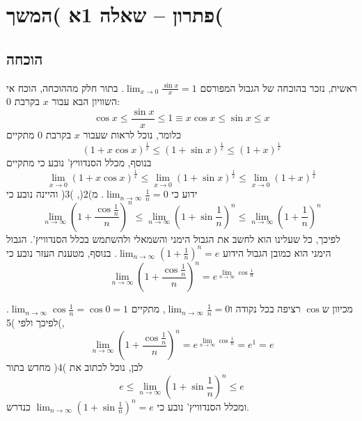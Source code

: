 \documentclass[11pt, oneside]{article}
\newcommand{\qed}{\R{$\blacksquare$}}
\newcommand{\br}{\\\\\\\\\\\\\\}
\begin{document}
\section*{פתרון -- שאלה 1א )המשך(}
\subsection*{הוכחה}
ראשית, נזכר בהוכחה של הגבול המפורסם $\lim_{x \to 0} \frac{\sin{x}}{x} = 1$. בתור חלק מההוכחה, הוכח אי השוויון הבא עבור $x$ בקרבת 0:
\[
\cos{x} \le \frac{\sin{x}}{x} \le 1 \equiv x\cos{x} \le \sin{x} \le x
\]
כלומר, נוכל לראות שעבור $x$ בקרבת 0 מתקיים
\begin{equation}
(1 + x\cos{x})^{\frac{1}{x}}
\le (1 + \sin{x})^{\frac{1}{x}}
\le (1 + x)^{\frac{1}{x}}
\end{equation}
בנוסף, מכלל הסנדוויץ' נובע כי מתקיים
\begin{equation}
\lim_{x \to 0} (1 + x\cos{x})^{\frac{1}{x}}
\le \lim_{x \to 0} (1 + \sin{x})^{\frac{1}{x}}
\le \lim_{x \to 0} (1 + x)^{\frac{1}{x}}
\end{equation}
ידוע כי $\lim_{n \to \infty} \frac{1}{n} = 0$. מ)2(, )3( והיינה נובע כי
\begin{equation}
\lim_{n \to \infty} \left(1 + \frac{\cos{\frac{1}{n}}}{n}\right)^{n}
\le \lim_{n \to \infty} \left(1 + \sin{\frac{1}{n}}\right)^{n}
\le \lim_{n \to \infty} \left(1 + \frac{1}{n}\right)^{n}
\end{equation}
לפיכך, כל שעלינו הוא לחשב את הגבול הימני והשמאלי ולהשתמש בכלל הסנדוויץ'. הגבול הימני הוא כמובן הגבול הידוע $\lim_{n \to \infty} \left(1 + \frac{1}{n}\right)^{n} = e$. בנוסף, מטענת העזר נובע כי
\begin{equation}
\lim_{n \to \infty} \left(1 + \frac{\cos{\frac{1}{n}}}{n}\right)^{n} = e^{\lim_{n \to \infty} \cos{\frac{1}{n}}}
\end{equation}

מכיוון ש$\cos$ רציפה בכל נקודה ו$\lim_{n \to \infty} \frac{1}{n} = 0$, מתקיים $\lim_{n \to \infty} \cos{\frac{1}{n}} = \cos{0} = 1$. לפיכך ולפי )5(,
\[
\lim_{n \to \infty} \left(1 + \frac{\cos{\frac{1}{n}}}{n}\right)^{n} = e^{\lim_{n \to \infty} \cos{\frac{1}{n}}} = e^{1} = e
\]
לכן, נוכל לכתוב את )4( מחדש בתור
\[
e \le \lim_{n \to \infty} \left(1 + \sin{\frac{1}{n}}\right)^{n} \le e
\]
ומכלל הסנדוויץ' נובע כי $\lim_{n \to \infty} \left(1 + \sin{\frac{1}{n}}\right)^{n} = e$ כנדרש.
\br\qed
\clearpage
\end{document}
